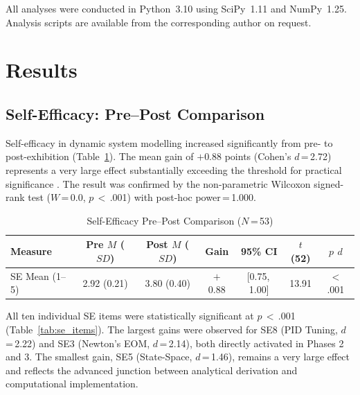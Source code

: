 \documentclass[12pt, a4paper]{article}
\begin{document}
All analyses were conducted in Python~3.10 using SciPy~1.11 and
NumPy~1.25. Analysis scripts are available from the corresponding
author on request.

\section{Results}

\subsection{Self-Efficacy: Pre--Post Comparison}

Self-efficacy in dynamic system modelling increased significantly
from pre- to post-exhibition (Table~\ref{tab:se_main}). The mean
gain of $+$0.88 points (Cohen's $d$\,=\,2.72) represents a very
large effect substantially exceeding the threshold for practical
significance \citep{cohen1988statistical}. The result was
confirmed by the non-parametric Wilcoxon signed-rank test
($W$\,=\,0.0, $p$\,$<$\,.001) with post-hoc power\,=\,1.000.

\begin{table}[ht]
\centering
\caption{Self-Efficacy Pre--Post Comparison ($N$\,=\,53)}
\label{tab:se_main}
\begin{tabular}{lcccccc}
\toprule
\textbf{Measure} & \textbf{Pre $M$ ($SD$)} & \textbf{Post $M$ ($SD$)} &
\textbf{Gain} & \textbf{95\% CI} & \textbf{$t$(52)} &
\textbf{$p$ \quad $d$} \\
\midrule
SE Mean (1--5) & 2.92 (0.21) & 3.80 (0.40) & $+$0.88 &
[0.75,\,1.00] & 13.91 & $<$.001 \quad 2.72 \\
\bottomrule
\end{tabular}
\end{table}

All ten individual SE items were statistically significant at
$p$\,$<$\,.001 (Table~\ref{tab:se_items}). The largest gains were
observed for SE8 (PID Tuning, $d$\,=\,2.22) and SE3 (Newton's
EOM, $d$\,=\,2.14), both directly activated in Phases 2 and 3.
The smallest gain, SE5 (State-Space, $d$\,=\,1.46), remains a
very large effect and reflects the advanced junction between
analytical derivation and computational implementation.
\end{document}
